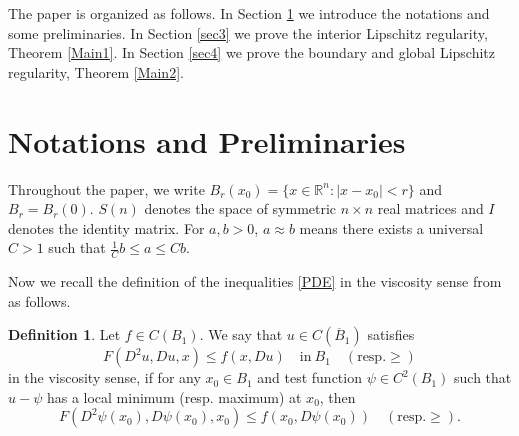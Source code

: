 \documentclass[reqno]{amsart}
\theoremstyle{plain}
\theoremstyle{definition}
\newtheorem{defn}{Definition}[section]
\theoremstyle{remark}
\numberwithin{equation}{section}
\begin{document}
The paper is organized as follows.
In Section \ref{sec2} we introduce the notations and some preliminaries.
In Section \ref{sec3} we prove the interior Lipschitz regularity, Theorem \ref{Main1}.
In Section \ref{sec4} we prove the boundary and global Lipschitz regularity, Theorem \ref{Main2}. 

\section{Notations and Preliminaries} \label{sec2}

Throughout the paper, we write $B_r(x_0) = \{ x \in \mathbb{R}^n : |x-x_0| <r \}$ and $B_r = B_r(0)$.
$S(n)$ denotes the space of symmetric $n \times n$ real matrices and $I$ denotes the identity matrix.
For $a,b>0$, $a\approx b$ means there exists a universal $C>1$ such that $\frac{1}{C}b\leq a \leq Cb$.

Now we recall the definition of the inequalities \eqref{PDE} in the viscosity sense from \cite{Ishii92, Caffarelli95} as follows.
\begin{defn}
Let $f \in C(B_1)$.
We say that $u \in C(\overline{B}_1)$ satisfies 
$$F(D^2u,Du,x) \leq f(x,Du) \quad\text{in}\ B_{1} \quad (\text{resp.} \geq) $$
in the viscosity sense, if for any $x_0 \in B_1$ and test function $\psi \in C^2(B_1)$ such that $u-\psi$ has a local minimum (resp. maximum) at $x_0$, then
$$F(D^2\psi(x_0),D\psi(x_0),x_0)\leq f(x_0,D\psi(x_0)) \quad (\text{resp.} \geq).$$ 
\end{defn}
\end{document}
